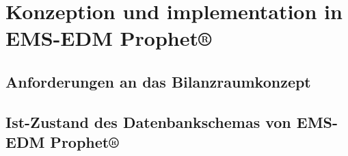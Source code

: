 \documentclass[a4paper,10pt,twoside]{report}
\begin{document}
\chapter{Konzeption und implementation in EMS-EDM Prophet®}
\section{Anforderungen an das Bilanzraumkonzept}



\section{Ist-Zustand des Datenbankschemas von EMS-EDM Prophet®}








\end{document}
